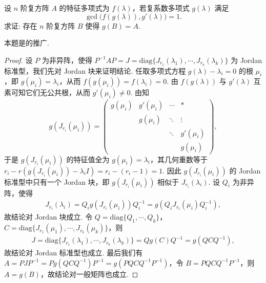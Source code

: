 \documentclass[../../main.tex]{subfiles}
\begin{document}
\begin{example}
设 \( n \) 阶复方阵 \( A \) 的特征多项式为 \( f(\lambda) \)，若复系数多项式 \( g(\lambda) \) 满足
\[
\gcd\bigl(f(g(\lambda)), g'(\lambda)\bigr) = 1.
\]
求证: 存在 \( n \) 阶复方阵 \( B \) 使得 \( g(B) = A \).
\end{example}
\begin{note}
本题是的推广.
\end{note}
\begin{proof}
设 \( P \) 为非异阵，使得 \( P^{-1}AP = J = \mathrm{diag}\{J_{r_1}(\lambda_1), \cdots, J_{r_k}(\lambda_k)\} \) 为 Jordan 标准型，我们先对 Jordan 块来证明结论. 任取多项式方程 \( g(\lambda) - \lambda_i = 0 \) 的根 \( \mu_i \)，即 \( g(\mu_i) = \lambda_i \)，从而 \( f(g(\mu_i)) = f(\lambda_i) = 0 \). 由 \( f(g(\lambda)) \) 与 \( g'(\lambda) \) 互素可知它们无公共根，从而 \( g'(\mu_i) \neq 0 \). 由知
\[
g(J_{r_i}(\mu_i)) = \begin{pmatrix} 
g(\mu_i) & g'(\mu_i) & \cdots & * \\
& g(\mu_i) & \ddots & \vdots \\
& & \ddots & g'(\mu_i) \\
& & & g(\mu_i)
\end{pmatrix},
\]
于是 \( g(J_{r_i}(\mu_i)) \) 的特征值全为 \( g(\mu_i)=\lambda_i \)，其几何重数等于 \( r_i - r(g(J_{r_i}(\mu_i)) - \lambda_i I) = r_i - (r_i - 1) = 1 \). 因此 \( g(J_{r_i}(\mu_i)) \) 的 Jordan 标准型中只有一个 Jordan 块，即 \( g(J_{r_i}(\mu_i)) \) 相似于 \( J_{r_i}(\lambda_i) \). 设 \( Q_i \) 为非异阵，使得 
\begin{align*}
J_{r_i}(\lambda_i) = Q_i g(J_{r_i}(\mu_i)) Q_i^{-1} = g(Q_i J_{r_i}(\mu_i) Q_i^{-1}),
\end{align*}
故结论对 Jordan 块成立. 令 \( Q = \mathrm{diag}\{Q_1, \cdots, Q_k\} \)，\( C = \mathrm{diag}\{J_{r_1}(\mu_1), \cdots, J_{r_k}(\mu_k)\} \)，则
\begin{align*}
J = \mathrm{diag}\{J_{r_1}(\lambda_1), \cdots, J_{r_k}(\lambda_k)\} = Q g(C) Q^{-1} = g(Q C Q^{-1}),
\end{align*}
故结论对 Jordan 标准型也成立. 最后我们有 \( A = P J P^{-1} = P g(Q C Q^{-1}) P^{-1} = g(P Q C Q^{-1} P^{-1}) \)，令 \( B = P Q C Q^{-1} P^{-1} \)，则 \( A = g(B) \)，故结论对一般矩阵也成立. 

\end{proof}
\end{document}
